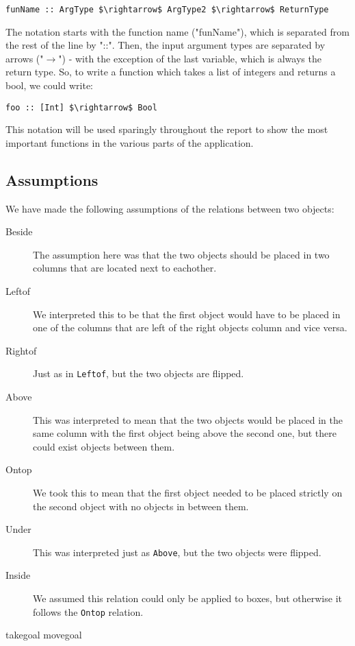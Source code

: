 \documentclass[11pt]{article}
\begin{document}
\begin{lstlisting}
funName :: ArgType $\rightarrow$ ArgType2 $\rightarrow$ ReturnType
\end{lstlisting}

The notation starts with the function name ("funName"), which is separated from the rest of the line by "::".
Then, the input argument types are separated by arrows ("$\rightarrow$") - with the exception of the last variable, which is always the return type.
So, to write a function which takes a list of integers and returns a bool, we could write:

\begin{lstlisting}
foo :: [Int] $\rightarrow$ Bool
\end{lstlisting}

This notation will be used sparingly throughout the report to show the most important functions in the various parts of the application.

\subsection*{Assumptions}
We have made the following assumptions of the relations between two objects:
\begin{description}
  \item[Beside] The assumption here was that the two objects should be placed in
    two columns that are located next to eachother.
  \item[Leftof] We interpreted this to be that the first object would have to be
    placed in one of the columns that are left of the right objects column and
    vice versa.
  \item[Rightof] Just as in \verb|Leftof|, but the two objects are flipped.
  \item[Above] This was interpreted to mean that the two objects would be placed
    in the same column with the first object being above the second one, but
    there could exist objects between them.
  \item[Ontop] We took this to mean that the first object needed to be placed
   strictly on the second object with no objects in between them.
  \item[Under] This was interpreted just as \verb|Above|, but the two objects
    were flipped.
  \item[Inside] We assumed this relation could only be applied to boxes, but
  otherwise it follows the \verb|Ontop| relation.
\end{description}
takegoal movegoal
\end{document}
